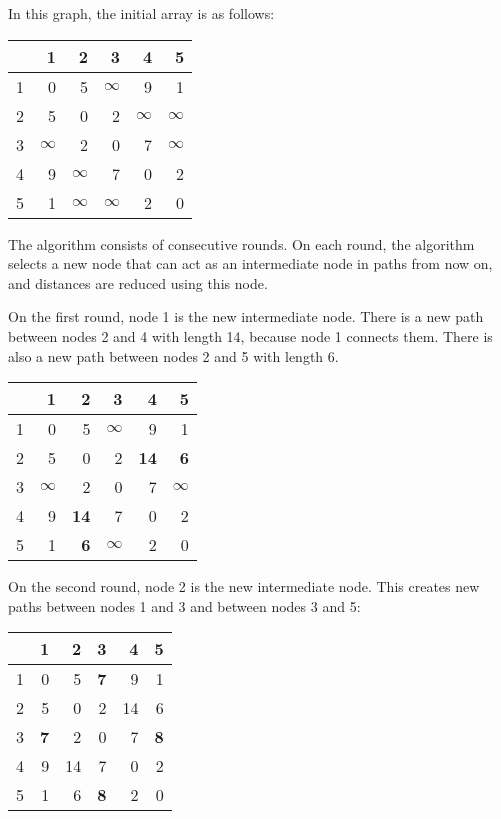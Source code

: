 In this graph, the initial array is as follows:
\begin{center}
\begin{tabular}{r|rrrrr}
 & 1 & 2 & 3 & 4 & 5 \\
\hline
1 & 0 & 5 & $\infty$ & 9 & 1 \\
2 & 5 & 0 & 2 & $\infty$ & $\infty$ \\
3 & $\infty$ & 2 & 0 & 7 & $\infty$ \\
4 & 9 & $\infty$ & 7 & 0 & 2 \\
5 & 1 & $\infty$ & $\infty$ & 2 & 0 \\
\end{tabular}
\end{center}
\vspace{10pt}
The algorithm consists of consecutive rounds.
On each round, the algorithm selects a new node
that can act as an intermediate node in paths from now on,
and distances are reduced using this node.

On the first round, node 1 is the new intermediate node.
There is a new path between nodes 2 and 4
with length 14, because node 1 connects them.
There is also a new path
between nodes 2 and 5 with length 6.

\begin{center}
\begin{tabular}{r|rrrrr}
 & 1 & 2 & 3 & 4 & 5 \\
\hline
1 & 0 & 5 & $\infty$ & 9 & 1 \\
2 & 5 & 0 & 2 & \textbf{14} & \textbf{6} \\
3 & $\infty$ & 2 & 0 & 7 & $\infty$ \\
4 & 9 & \textbf{14} & 7 & 0 & 2 \\
5 & 1 & \textbf{6} & $\infty$ & 2 & 0 \\
\end{tabular}
\end{center}
\vspace{10pt}

On the second round, node 2 is the new intermediate node.
This creates new paths between nodes 1 and 3
and between nodes 3 and 5:

\begin{center}
\begin{tabular}{r|rrrrr}
 & 1 & 2 & 3 & 4 & 5 \\
\hline
1 & 0 & 5 & \textbf{7} & 9 & 1 \\
2 & 5 & 0 & 2 & 14 & 6 \\
3 & \textbf{7} & 2 & 0 & 7 & \textbf{8} \\
4 & 9 & 14 & 7 & 0 & 2 \\
5 & 1 & 6 & \textbf{8} & 2 & 0 \\
\end{tabular}
\end{center}
\vspace{10pt}

